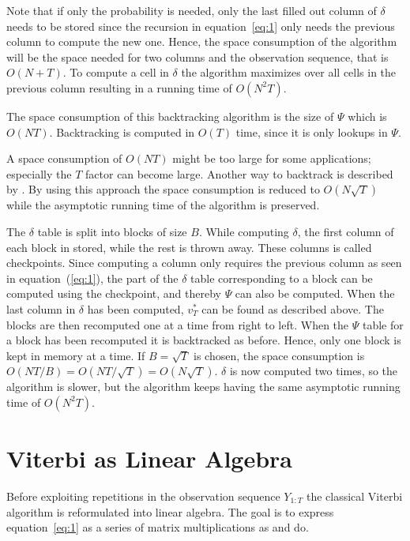 Note that if only the probability is needed, only the last filled out column of
$\delta$ needs to be stored since the recursion in equation~\eqref{eq:1} only
needs the previous column to compute the new one. Hence, the space consumption
of the algorithm will be the space needed for two columns and the observation
sequence, that is $O(N + T)$. To compute a cell in $\delta$ the algorithm
maximizes over all cells in the previous column resulting in a running time of
$O(N^2 T)$.

The space consumption of this backtracking algorithm is the size of $\Psi$
which is $O(N T)$. Backtracking is computed in $O(T)$ time, since it is only
lookups in $\Psi$.

A space consumption of $O(N T)$ might be too large for some applications;
especially the $T$ factor can become large. Another way to backtrack is
described by \citet{Tarnas01061998}. By using this approach the space
consumption is reduced to $O(N \sqrt{T})$ while the asymptotic running
time of the algorithm is preserved.

The $\delta$ table is split into blocks of size $B$. While computing $\delta$,
the first column of each block in stored, while the rest is thrown away. These
columns is called checkpoints. Since computing a column only requires the
previous column as seen in equation~(\ref{eq:1}), the part of the
$\delta$ table corresponding to a block can be computed using the checkpoint,
and thereby $\Psi$ can also be computed. When the last column in $\delta$ has
been computed, $v_T^*$ can be found as described above. The blocks are then
recomputed one at a time from right to left. When the $\Psi$ table for a block
has been recomputed it is backtracked as before. Hence, only one block is kept
in memory at a time. If $B = \sqrt{T}$ is chosen, the space consumption is
$O(N T / B) = O(N T / \sqrt{T}) = O(N \sqrt{T})$. $\delta$ is now computed two times, so
the algorithm is slower, but the algorithm keeps having the same
asymptotic running time of $O(N^2 T)$.

\section{Viterbi as Linear Algebra}
\label{sec:algorithm-as-linear}

Before exploiting repetitions in the observation sequence $Y_{1:T}$ the
classical Viterbi algorithm is reformulated into linear algebra. The goal is to
express equation~\eqref{eq:1} as a series of matrix multiplications as
\citet{sand2013ziphmmlib} and \citet{lifshits2009speeding} do.

